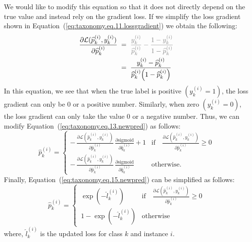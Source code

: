 \documentclass[authoryear,preprint,review,12pt]{elsarticle}
\begin{document}
We would like to modify this equation so that it does not directly depend on the true value and instead rely on the gradient loss. If we simplify the loss gradient shown in Equation~(\ref{eq:taxonomy.eq.11.lossgradient})  we obtain the following:
\begin{align}
    \label{eq:taxonomy.eq.14.newlossgradient}
    \frac{\partial \mathcal{L}(\widehat{p}_k^{(i)}, y_k^{(i)})}{\partial \widehat{p}_k^{(i)}}
    & \; = \; \textcolor{gray}{\frac{y_k^{(i)}}{\widehat{p}_k^{(i)}} - \frac{1 - y_k^{(i)}}{1 - \widehat{p}_k^{(i)}} }
    \\
    & \; = \; \frac{y_k^{(i)} - \widehat{p}_k^{(i)}}{\widehat{p}_k^{(i)}{\left(1 - \widehat{p}_k^{(i)}\right)}}
\end{align}
In this equation, we see that when the true label is positive $\left(y_k^{(i)}=1\right) $, the loss gradient can only be 0 or a positive number. Similarly, when zero $\left(y_k^{(i)}=0\right) $, the loss gradient can only take the value 0 or a negative number. Thus, we can modify Equation~(\ref{eq:taxonomy.eq.13.newpred})  as follows:
\begin{equation}
    \label{eq:taxonomy.eq.15.newpred}
    \widehat{p}_k^{(i)} =
    \begin{cases}
        -\, \frac{\partial \mathcal{L}(\widehat{p}_k^{(i)}, y_k^{(i)})}{\partial {\widehat p}_k^{(i)}} \, \frac{\partial{\text{sigmoid}}}{\partial{\widehat{q}_k^{(i)}}} + 1
        &
        \text{if} \quad \frac{\partial \mathcal{L}(\widehat{p}_k^{(i)}, y_k^{(i)})}{\partial {\widehat p}_k^{(i)}} \geq 0
        \\
        -\, \frac{\partial \mathcal{L}(\widehat{p}_k^{(i)}, y_k^{(i)})}{\partial {\widehat p}_k^{(i)}} \, \frac{\partial{\text{sigmoid}}}{\partial{\widehat{q}_k^{(i)}}}
        &
        \text{otherwise.}
    \end{cases}
\end{equation}
Finally, Equation~(\ref{eq:taxonomy.eq.15.newpred}) can be simplified as follows:
\begin{equation}
    \label{eq:taxonomy.eq.16.newpred}
    \widehat{p}_k^{(i)} =
    \begin{cases}
        \, \exp(-\widehat{l}_k^{(i)})
        &
        \text{if} \quad \frac{\partial \mathcal{L}(\widehat{p}_k^{(i)}, y_k^{(i)})}{\partial {\widehat p}_k^{(i)}} \geq 0
        \\
        \, 1 - \exp(-\widehat{l}_k^{(i)})
        &
        \text{otherwise}
    \end{cases}
\end{equation}
where, ${\widehat l}_k^{(i)} $ is the updated loss for class $k $ and instance $i $.
\end{document}

